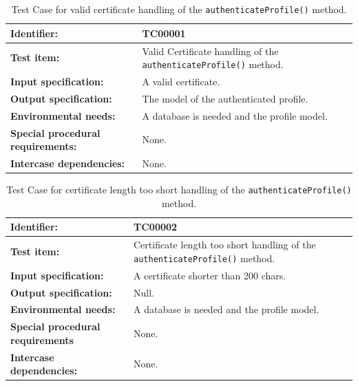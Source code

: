\begin{table}[htbp]
	\centering
		\begin{tabular}{| p{4.5cm} | m{9cm} |}
			\hline
			\textbf{Identifier:} 					& TC00001 \\ \hline
			\textbf{Test item:}						& Valid Certificate handling of the \texttt{authenticateProfile()} method. \\ \hline
			\textbf{Input specification:}			& A valid certificate. \\ \hline
			\textbf{Output specification:} 			& The model of the authenticated profile. \\ \hline
			\textbf{Environmental needs:}			& A database is needed and the profile model. \\ \hline
			\textbf{Special procedural requirements:}	& None. \\ \hline
			\textbf{Intercase dependencies:}			& None. \\ \hline
		\end{tabular}
	\caption{Test Case for valid certificate handling of the \texttt{authenticateProfile()} method.}
	\label{tab:TestCase_ValidCertificateHandling}
\end{table}

\begin{table}[htbp]
	\centering
		\begin{tabular}{| p{4.5cm} | m{9cm} |}
			\hline
			\textbf{Identifier:} 					& TC00002 \\ \hline
			\textbf{Test item:}						& Certificate length too short handling of the \texttt{authenticateProfile()} method. \\ \hline
			\textbf{Input specification:}			& A certificate shorter than 200 chars. \\ \hline
			\textbf{Output specification:} 			& Null. \\ \hline
			\textbf{Environmental needs:}			& A database is needed and the profile model. \\ \hline
			\textbf{Special procedural requirements}	& None. \\ \hline
			\textbf{Intercase dependencies:}			& None. \\ \hline
		\end{tabular}
	\caption{Test Case for certificate length too short handling of the \texttt{authenticateProfile()} method.}
	\label{tab:TestCase_CertificateToShortHandling}
\end{table}

